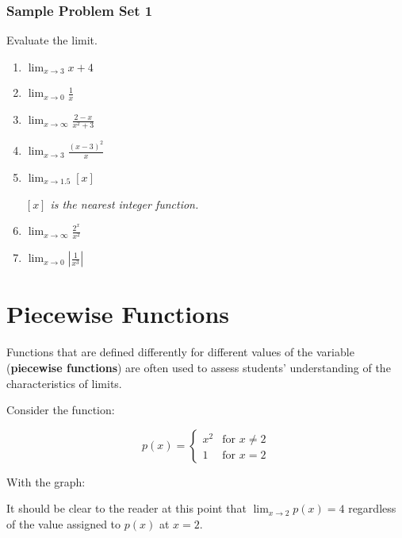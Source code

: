 \documentclass[10pt,a4paper]{book}
\begin{document}
\subsubsection{Sample Problem Set 1}
Evaluate the limit.
\begin{multicols}{2}
\begin{enumerate}
	\item $\displaystyle \lim_{x \to 3} {x+4}$
    \item $\displaystyle \lim_{x \to 0} {\frac{1}{x}}$
    \item $\displaystyle \lim_{x \to \infty} {\frac{2-x}{x^{2}+3}}$
    \item $\displaystyle \lim_{x \to 3} {\frac{\left(x-3\right)^{2}}{x}}$
    \item $\displaystyle \lim_{x \to 1.5} {\left[x\right]}$\
    
    \textit{$\left[x\right]$ is the nearest integer function.}
    \item $\displaystyle \lim_{x \to \infty} {\frac{2^{x}}{x^{2}}}$
    \item $\displaystyle \lim_{x \to 0} {\left|\frac{1}{x^{3}}\right|}$
\end{enumerate}
\end{multicols}
\section{Piecewise Functions}
Functions that are defined differently for different values of the variable (\textbf{piecewise functions}) are often used to assess students' understanding of the characteristics of limits.

Consider the function:

\[
p(x) = \left\{
	\begin{array}{lr}
       x^{2} & \text{for } x \neq 2\\
       1 & \text{for } x = 2
     \end{array}
   \right.
\]

With the graph:


It should be clear to the reader at this point that $\displaystyle\lim_{x \to 2} p(x) = 4$ regardless of the value assigned to $p(x)$ at $x=2$.
\end{document}
